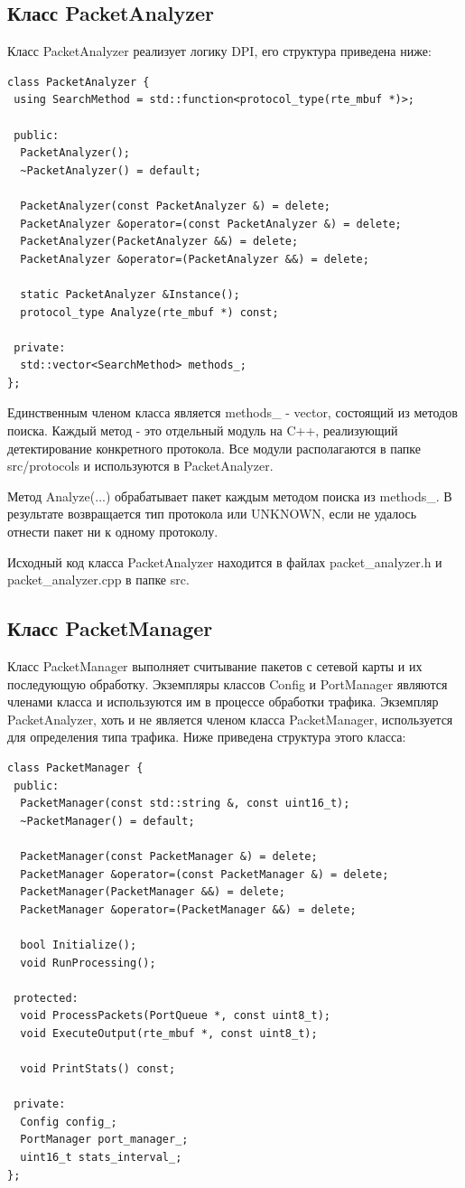 \subsection{Класс PacketAnalyzer}
Класс PacketAnalyzer реализует логику DPI, его структура приведена ниже:
\begin{lstlisting}
class PacketAnalyzer {
 using SearchMethod = std::function<protocol_type(rte_mbuf *)>;

 public:
  PacketAnalyzer();
  ~PacketAnalyzer() = default;

  PacketAnalyzer(const PacketAnalyzer &) = delete;
  PacketAnalyzer &operator=(const PacketAnalyzer &) = delete;
  PacketAnalyzer(PacketAnalyzer &&) = delete;
  PacketAnalyzer &operator=(PacketAnalyzer &&) = delete;

  static PacketAnalyzer &Instance();
  protocol_type Analyze(rte_mbuf *) const;

 private:
  std::vector<SearchMethod> methods_;
};
\end{lstlisting}

Единственным членом класса является methods\_ - vector, состоящий из методов поиска. Каждый метод - это отдельный модуль на C++, реализующий детектирование конкретного протокола. Все модули располагаются в папке src/protocols и используются в PacketAnalyzer.

Метод Analyze(...) обрабатывает пакет каждым методом поиска из methods\_. В результате возвращается тип протокола или UNKNOWN, если не удалось отнести пакет ни к одному протоколу.

Исходный код класса PacketAnalyzer находится в файлах packet\_analyzer.h и packet\_analyzer.cpp в папке src.

\subsection{Класс PacketManager}
Класс PacketManager выполняет считывание пакетов с сетевой карты и их последующую обработку. Экземпляры классов Config и PortManager являются членами класса и используются им в процессе обработки трафика. Экземпляр PacketAnalyzer, хоть и не является членом класса PacketManager, используется для определения типа трафика. Ниже приведена структура этого класса:
\begin{lstlisting}
class PacketManager {
 public:
  PacketManager(const std::string &, const uint16_t);
  ~PacketManager() = default;

  PacketManager(const PacketManager &) = delete;
  PacketManager &operator=(const PacketManager &) = delete;
  PacketManager(PacketManager &&) = delete;
  PacketManager &operator=(PacketManager &&) = delete;

  bool Initialize();
  void RunProcessing();

 protected:
  void ProcessPackets(PortQueue *, const uint8_t);
  void ExecuteOutput(rte_mbuf *, const uint8_t);

  void PrintStats() const;

 private:
  Config config_;
  PortManager port_manager_;
  uint16_t stats_interval_;
};
\end{lstlisting}

